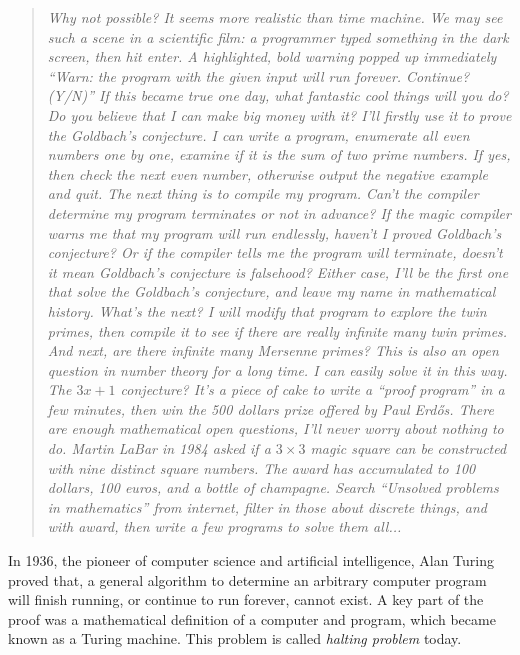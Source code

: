 \documentclass{article}
\begin{document}
\begin{quotation}
\itshape
Why not possible? It seems more realistic than time machine. We may see such a scene in a scientific film: a programmer typed something in the dark screen, then hit enter. A highlighted, bold warning popped up immediately ``Warn: the program with the given input will run forever. Continue? (Y/N)'' If this became true one day, what fantastic cool things will you do? Do you believe that I can make big money with it? I'll firstly use it to prove the Goldbach's conjecture. I can write a program, enumerate all even numbers one by one, examine if it is the sum of two prime numbers. If yes, then check the next even number, otherwise output the negative example and quit. The next thing is to compile my program. Can't the compiler determine my program terminates or not in advance? If the magic compiler warns me that my program will run endlessly, haven't I proved Goldbach's conjecture? Or if the compiler tells me the program will terminate, doesn't it mean Goldbach's conjecture is falsehood? Either case, I'll be the first one that solve the Goldbach's conjecture, and leave my name in mathematical history. What's the next? I will modify that program to explore the twin primes, then compile it to see if there are really infinite many twin primes. And next, are there infinite many Mersenne primes? This is also an open question in number theory for a long time. I can easily solve it in this way. The $3x + 1$ conjecture? It's a piece of cake to write a ``proof program'' in a few minutes, then win the 500 dollars prize offered by Paul Erdős. There are enough mathematical open questions, I'll never worry about nothing to do. Martin LaBar in 1984 asked if a $3 \times 3$ magic square can be constructed with nine distinct square numbers. The award has accumulated to 100 dollars, 100 euros, and a bottle of champagne. Search ``Unsolved problems in mathematics'' from internet, filter in those about discrete things, and with award, then write a few programs to solve them all...
\end{quotation}

In 1936, the pioneer of computer science and artificial intelligence, Alan Turing proved that, a general algorithm to determine an arbitrary computer program will finish running, or continue to run forever, cannot exist. A key part of the proof was a mathematical definition of a computer and program, which became known as a Turing machine. This problem is called {\em halting problem} today.
\end{document}
